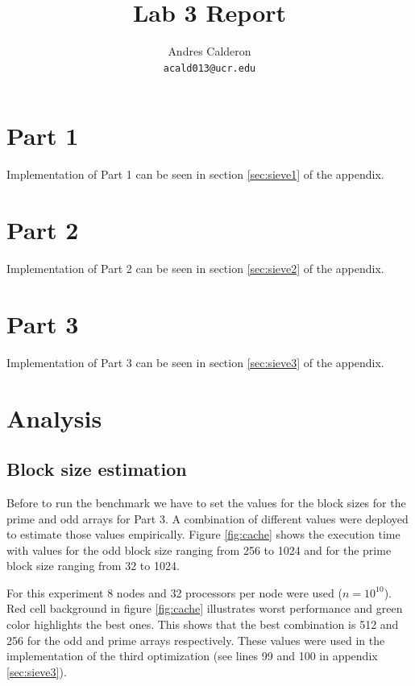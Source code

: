 \documentclass[10pt]{scrartcl}
\title{Lab 3 Report}
\author{
   Andres Calderon\\
  \small \texttt{acald013@ucr.edu}
}
\begin{document}
\maketitle

\section{Part 1}
Implementation of Part 1 can be seen in section \ref{sec:sieve1} of the appendix.

\section{Part 2}
Implementation of Part 2 can be seen in section \ref{sec:sieve2} of the appendix.

\section{Part 3}
Implementation of Part 3 can be seen in section \ref{sec:sieve3} of the appendix.

\section{Analysis}
\subsection{Block size estimation}
Before to run the benchmark we have to set the values for the block sizes for the prime and odd arrays for Part 3.  A combination of different values were deployed to estimate those values empirically.  Figure \ref{fig:cache} shows the execution time with values for the odd block size ranging from 256 to 1024 and for the prime block size ranging from 32 to 1024.  

For this experiment 8 nodes and 32 processors per node were used ($n=10^{10}$). Red cell background in figure \ref{fig:cache} illustrates worst performance and green color highlights the best ones.  This shows that the best combination is 512 and 256 for the odd and prime arrays respectively.  These values were used in the implementation of the third optimization (see lines 99 and 100 in appendix \ref{sec:sieve3}).
\end{document}
